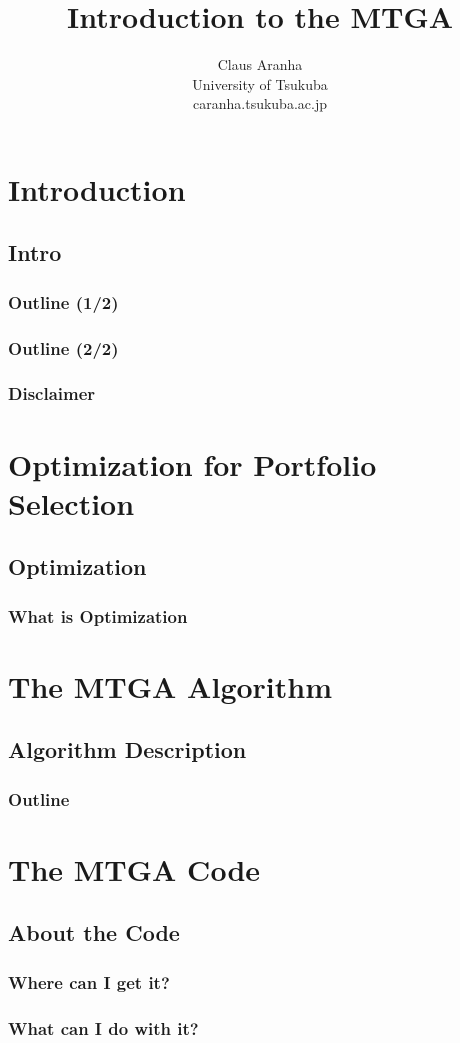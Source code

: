 \documentclass{beamer}[10pt]
\title[]{Introduction to the MTGA}
\author[Claus Aranha]{Claus Aranha\\{\footnotesize University of
    Tsukuba\\caranha\@@cs.tsukuba.ac.jp}}
\begin{document}
\section{Introduction}
\subsection{Intro}
\begin{frame}
  \maketitle
\end{frame}

\begin{frame}
  \frametitle{Outline (1/2)}
\end{frame}

\begin{frame}
  \frametitle{Outline (2/2)}
\end{frame}

\begin{frame}
  \frametitle{Disclaimer}
\end{frame}

\section{Optimization for Portfolio Selection}
\subsection{Optimization}
\begin{frame}
  \frametitle{What is Optimization}
\end{frame}

\section{The MTGA Algorithm}
\subsection{Algorithm Description}
\begin{frame}
  \frametitle{Outline}
\end{frame}

\section{The MTGA Code}
\subsection{About the Code}
\begin{frame}
  \frametitle{Where can I get it?}
\end{frame}

\begin{frame}
  \frametitle{What can I do with it?}
\end{frame}
\end{document}
